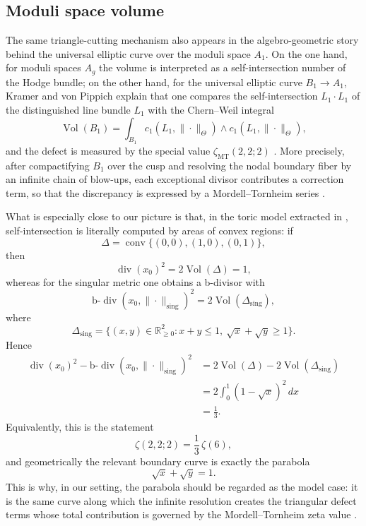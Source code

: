 \documentclass[a4paper,american,11pt]{amsart}
\theoremstyle{plain}
\theoremstyle{definition}
\newcommand{\R}{\mathbb R}
\begin{document}
\subsection{Moduli space volume}\label{sec_moduli}

The same triangle-cutting mechanism also appears in the algebro-geometric
story behind the universal elliptic curve over the moduli space \(A_1\). On
the one hand, for moduli spaces \(A_g\) the volume is interpreted as a
self-intersection number of the Hodge bundle; on the other hand, for the
universal elliptic curve \(B_1\to A_1\), Kramer and von Pippich explain that
one compares the self-intersection \(L_1\cdot L_1\) of the distinguished line
bundle \(L_1\) with the Chern--Weil integral
\[
\operatorname{Vol}(B_1)
=
\int_{B_1}
c_1(L_1,\|\cdot\|_\Theta)\wedge c_1(L_1,\|\cdot\|_\Theta),
\]
and the defect is measured by the special value
\(\zeta_{\mathrm{MT}}(2,2;2)\) \cite{KramerPippich2015Snapshot}. More
precisely, after compactifying \(B_1\) over the cusp and resolving the nodal
boundary fiber by an infinite chain of blow-ups, each exceptional divisor
contributes a correction term, so that the discrepancy is expressed by a
Mordell--Tornheim series
\cite{KramerPippich2015Snapshot,BurgosGilKramerKuehn2016}.

What is especially close to our picture is that, in the toric model extracted
in \cite{BurgosGilKramerKuehn2016}, self-intersection is literally computed
by areas of convex regions: if
\[
\Delta=\operatorname{conv}\{(0,0),(1,0),(0,1)\},
\]
then
\[
\operatorname{div}(x_0)^2=2\operatorname{Vol}(\Delta)=1,
\]
whereas for the singular metric one obtains a b-divisor with
\[
\mathrm{b}\text{-}\operatorname{div}
(x_0,\|\cdot\|_{\mathrm{sing}})^2
=
2\operatorname{Vol}(\Delta_{\mathrm{sing}}),
\]
where
\[
\Delta_{\mathrm{sing}}
=
\{(x,y)\in\R_{\ge 0}^2:x+y\le 1,\ \sqrt{x}+\sqrt{y}\ge 1\}.
\]
Hence
\begin{align*}
\operatorname{div}(x_0)^2
-
\mathrm{b}\text{-}\operatorname{div}
(x_0,\|\cdot\|_{\mathrm{sing}})^2
&=
2\operatorname{Vol}(\Delta)-2\operatorname{Vol}(\Delta_{\mathrm{sing}}) \\
&=
2\int_0^1 (1-\sqrt{x})^2\,dx \\
&=
\frac13.
\end{align*}
Equivalently, this is the statement
\[
\zeta(2,2;2)=\frac13\,\zeta(6),
\]
and geometrically the relevant boundary curve is exactly the parabola
\[
\sqrt{x}+\sqrt{y}=1.
\]
This is why, in our setting, the parabola should be regarded as the model
case: it is the same curve along which the infinite resolution creates the
triangular defect terms whose total contribution is governed by the
Mordell--Tornheim zeta value
\cite{KramerPippich2015Snapshot,BurgosGilKramerKuehn2016}.
\end{document}
